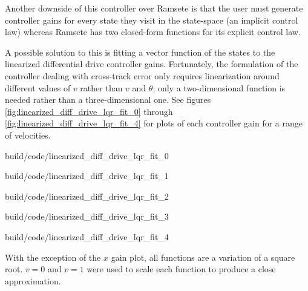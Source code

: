 Another downside of this controller over Ramsete is that the user must generate
controller gains for every state they visit in the state-space (an implicit
control law) whereas Ramsete has two closed-form functions for its explicit
control law.

A possible solution to this is fitting a vector function of the states to the
linearized differential drive controller gains. Fortunately, the formulation of
the controller dealing with cross-track error only requires linearization around
different values of $v$ rather than $v$ and $\theta$; only a two-dimensional
function is needed rather than a three-dimensional one. See figures
\ref{fig:linearized_diff_drive_lqr_fit_0} through
\ref{fig:linearized_diff_drive_lqr_fit_4} for plots of each controller gain for
a range of velocities.

\begin{bookfigure}
  \begin{minisvg}{build/code/linearized_diff_drive_lqr_fit_0}
    \caption{Linearized differential drive controller LQR gain regression fit
      ($x$)}
    \label{fig:linearized_diff_drive_lqr_fit_0}
  \end{minisvg}
  \hfill
  \begin{minisvg}{build/code/linearized_diff_drive_lqr_fit_1}
    \caption{Linearized differential drive controller LQR gain fit regression
      fit ($y$)}
    \label{fig:linearized_diff_drive_lqr_fit_1}
  \end{minisvg}
  \hfill
  \begin{minisvg}{build/code/linearized_diff_drive_lqr_fit_2}
    \caption{Linearized differential drive controller LQR gain regression fit
      ($\theta$)}
    \label{fig:linearized_diff_drive_lqr_fit_2}
  \end{minisvg}
  \hfill
  \begin{minisvg}{build/code/linearized_diff_drive_lqr_fit_3}
    \caption{Linearized differential drive controller LQR gain regression fit
      ($v_l$)}
    \label{fig:linearized_diff_drive_lqr_fit_3}
  \end{minisvg}
  \hfill
  \begin{minisvg}{build/code/linearized_diff_drive_lqr_fit_4}
    \caption{Linearized differential drive controller LQR gain regression fit
      ($v_r$)}
    \label{fig:linearized_diff_drive_lqr_fit_4}
  \end{minisvg}
\end{bookfigure}

With the exception of the $x$ gain plot, all functions are a variation of a
square root. $v = 0$ and $v = 1$ were used to scale each function to produce a
close approximation.

